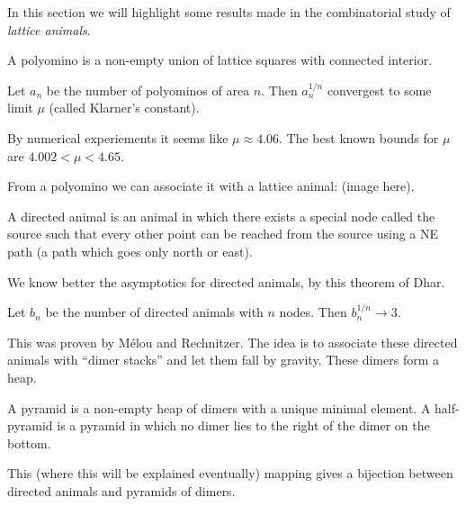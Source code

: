 In this section we will highlight some results made in the combinatorial study of \textit{lattice animals}.

\begin{definition}
A polyomino is a non-empty union of lattice squares with connected interior.
\end{definition}

\begin{theorem}
Let $a_n$ be the number of polyominos of area $n$. Then $a_n^{1/n}$ convergest to some limit $\mu$ (called Klarner's constant). 
\end{theorem}
 By numerical experiements it seems like $\mu \approx 4.06$. The best known bounds for $\mu$ are $4.002 < \mu < 4.65$.

From a polyomino we can associate it with a lattice animal: (image here).

\begin{definition}
A directed animal is an animal in which there exists a special node called the source such that every other point can be reached from the source using a NE path (a path which goes only north or east).
\end{definition}

We know better the asymptotics for directed animals, by this theorem of Dhar.

\begin{theorem}
Let $b_n$ be the number of directed animals with $n$ nodes. Then $b_n^{1/n} \to 3$. 
\end{theorem}

This was proven by M\'elou and Rechnitzer. The idea is to associate these directed animals with ``dimer stacks'' and let them fall by gravity. These dimers form a heap.

\begin{definition}
A pyramid is a non-empty heap of dimers with a unique minimal element. A half-pyramid is a pyramid in which no dimer lies to the right of the dimer on the bottom.
\end{definition}
\begin{theorem}
This (where this will be explained eventually) mapping gives a bijection between directed animals and pyramids of dimers.
\end{theorem}

